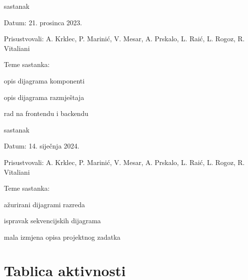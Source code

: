 \begin{packed_enum}
	\item  sastanak
	\item[] \begin{packed_item}
		\item Datum: 21. prosinca 2023.
		\item Prisustvovali: A. Krklec, P. Marinić, V. Mesar, A. Prskalo, L. Raić, L. Rogoz, R. Vitaliani
		\item Teme sastanka:
		\begin{packed_item}
			\item opis dijagrama komponenti
			\item opis dijagrama razmještaja
			\item rad na frontendu i backendu
		\end{packed_item}
	\end{packed_item}

	\item  sastanak
	\item[] \begin{packed_item}
		\item Datum: 14. siječnja 2024.
		\item Prisustvovali: A. Krklec, P. Marinić, V. Mesar, A. Prskalo, L. Raić, L. Rogoz, R. Vitaliani
		\item Teme sastanka:
		\begin{packed_item}
			\item ažurirani dijagrami razreda
			\item ispravak sekvencijskih dijagrama
			\item mala izmjena opisa projektnog zadatka
		\end{packed_item}
	\end{packed_item}


\end{packed_enum}

\eject
\section*{Tablica aktivnosti}

